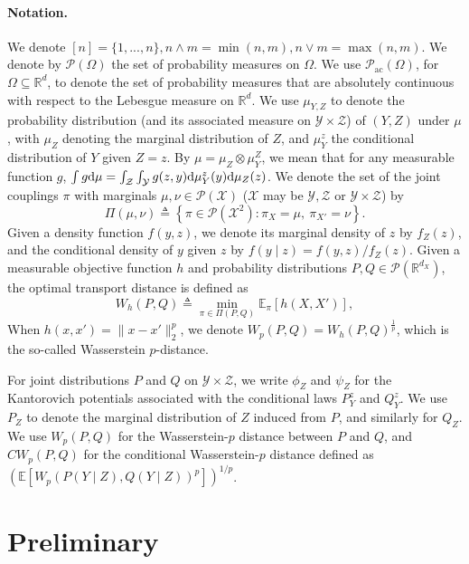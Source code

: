 \documentclass{article}
\theoremstyle{plain}
\theoremstyle{definition}
\def\EE{\mathbb{E}}
\def\PP{P}
\def\QQ{Q}
\def\RR{\mathbb{R}}
\def\calP{\mathcal{P}}
\def\calX{\mathcal{X}}
\def\calY{\mathcal{Y}}
\def\calZ{\mathcal{Z}}
\newcommand{\Let}{\triangleq}
\theoremstyle{plain}
\newcommand{\diff}{{\rm d}}
\def\EE{\mathbb{E}}
\def\RR{\mathbb{R}}
\def\calP{\mathcal{P}}
\def\calX{\mathcal{X}}
\def\calY{\mathcal{Y}}
\def\calZ{\mathcal{Z}}
\newcommand{\Cwass}{{CW}}
\renewcommand{\Let}{\triangleq}
\begin{document}
\paragraph{Notation.}
We denote $[n] = \{1,...,n\}, n\wedge m = \min(n,m), n \vee m = \max(n,m)$. 
We denote by $\calP(\Omega)$ the set of probability measures on $\Omega$. 
We use $\mathcal{P}_{\mathrm{ac}}(\Omega)$, for $\Omega \subseteq \mathbb{R}^d$, to denote the set of probability measures that are absolutely continuous with respect to the Lebesgue measure on $\mathbb{R}^d$.
We use $\mu_{Y,Z}$ to denote the probability distribution (and its associated measure on $\calY \times \calZ$) of $(Y, Z)$ under $\mu$, with $\mu_{Z}$ denoting the marginal distribution of $Z$, and $\mu^{z}_{Y}$ the conditional distribution of $Y$ given $Z=z$. By $\mu = \mu_Z \otimes \mu_Y^{Z}$, we mean that for any measurable function $g$, $\int g \diff \mu = \int_{\calZ} \int_{\calY} g(z,y) \diff \mu_Y^{z}(y) \diff \mu_Z(z)$. 
We denote the set of the joint couplings $\pi$ with marginals $\mu, \nu \in \calP(\calX)$ ($\calX$ may be $\calY, \calZ$ or $\calY \times \calZ$) by
\begin{equation}\label{eq:coupling_set}
    \Pi(\mu, \nu) \Let \left\{\pi \in \calP(\calX^2): \pi_{X} = \mu,~\pi_{X'} = \nu \right\}.
\end{equation}
Given a density function $f(y,z)$, we denote its marginal density of $z$ by $f_Z(z)$, and the conditional density of $y$ given $z$ by
$f(y \mid z) = {f(y,z)}/{f_Z (z)}$.
Given a measurable objective function $h$ and probability distributions $\PP, \QQ \in \calP(\RR^{d_X})$, the optimal transport distance is defined as 
    \[
    W_h(\PP, \QQ) \Let \min_{\pi \in \Pi(\PP, \QQ)} \EE_{\pi}[h(X, X')],
    \]
    When $h(x,x') = \|x - x'\|_2^p$, we denote $W_p(\PP, \QQ) = W_h(\PP, \QQ)^{\frac{1}{p}}$, which is the so-called Wasserstein $p$-distance.

For joint distributions $\PP$ and $\QQ$ on $\mathcal Y \times \mathcal Z$,
we write $\phi_Z$ and $\psi_Z$ for the Kantorovich potentials associated
with the conditional laws $\PP_Y^z$ and $\QQ_Y^z$.
We use $P_Z$ to denote the marginal distribution of $Z$ induced from $P$, and similarly for $Q_Z$.
We use $W_p(\PP,\QQ)$ for the Wasserstein-$p$ distance between $\PP$ and $\QQ$, and $\Cwass_p(\PP,\QQ)$ for the conditional Wasserstein-$p$ distance defined as $(\EE[W_p(\PP(Y\mid Z),\QQ(Y\mid Z))^p])^{1/p}$.


\section{Preliminary}\label{sec:problem_form}
\end{document}
